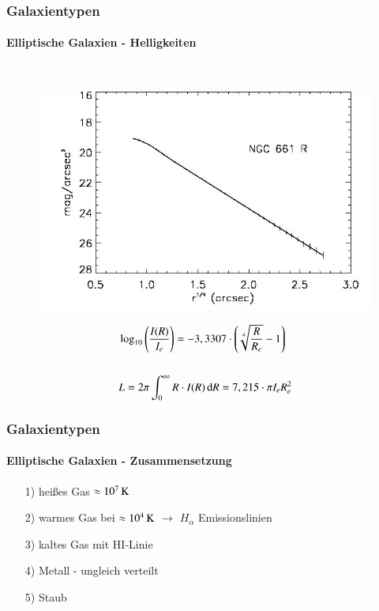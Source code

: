 \begin{frame}
\frametitle{Galaxientypen}
\framesubtitle{Elliptische Galaxien - Helligkeiten}

\hfill \\

\begin{figure}
\includegraphics[scale=0.25]{Helligkeitsprofil_Ellipse.jpg}
\end{figure}


\begin{align*}
&\log_{10} \left( \frac{I(R)}{I_e} \right) = - 3,3307 \cdot \left( \sqrt[4]{\frac{R}{R_e}}  - 1 \right) \\
\hfill \\
&L = 2\pi \int_0^\infty R \cdot I(R) \d R = 7,215 \cdot \pi I_e R_e^2
\end{align*}

\end{frame}


\begin{frame}
\frametitle{Galaxientypen}
\framesubtitle{Elliptische Galaxien - Zusammensetzung}

\begin{itemize}
\item[1)] heißes Gas $\approx \unit[10^7]{K}$ \\
\item[2)] warmes Gas bei $\approx \unit[10^4]{K}$ $\rightarrow$ $H_\alpha$ Emissionslinien
\item[3)] kaltes Gas mit HI-Linie
\item[4)] Metall - ungleich verteilt
\item[5)] Staub 
\end{itemize}

\end{frame}


